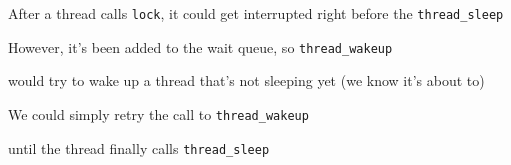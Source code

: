   \begin{slide}


    After a thread calls \texttt{lock}, it could get interrupted right before
    the \texttt{thread\_sleep}
    \medskip

    However, it's been added to the wait queue, so \texttt{thread\_wakeup}

    would try to wake up a thread that's not sleeping yet (we know it's about
    to)
    \medskip

    We could simply retry the call to \texttt{thread\_wakeup}

    until the thread finally calls \texttt{thread\_sleep}

  \end{slide}



